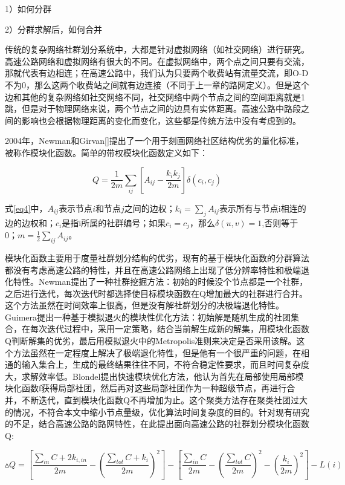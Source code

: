 				1）如何分群

				2）分群求解后，如何合并

			传统的复杂网络社群划分系统中，大都是针对虚拟网络（如社交网络）进行研究。高速公路网络和虚拟网络有很大的不同。在虚拟网络中，两个点之间只要有交流，那就代表有边相连；在高速公路中，我们认为只要两个收费站有流量交流，即O-D不为0，那么这两个收费站之间就有边连接（不同于上一章的路网定义）。但是这个边和其他的复杂网络如社交网络不同，社交网络中两个节点之间的空间距离就是1跳，但是对于物理网络来说，两个节点之间的边具有实体距离。高速公路中路段之间的影响也会根据物理距离的变化而变化，这些都是传统方法中没有考虑到的。

			2004年，Newman和Girvan[]提出了一个用于刻画网络社区结构优劣的量化标准，被称作模块化函数。简单的带权模块化函数定义如下：

			\begin{equation}
			Q = \frac{1}{{2m}}\sum\limits_{ij} {[{A_{ij}} - \frac{{{k_i}{k_j}}}{{2m}}]\delta ({c_i},{c_j})}
			\label{eq4}
			\end{equation}

			式\ref{eq4}中，$A_{ij}$表示节点$i$和节点$j$之间的边权；$k_i=\sum\limits_{j} {A_{ij}}$表示所有与节点i相连的边的边权和；$c_i$是指i所属的社群编号；如果$c_i=c_j$，那么$\delta (u,v)=1$,否则等于0；$m=\frac{1}{{2}}\sum\limits_{ij} {A_{ij}}$。

			模块化函数主要用于度量社群划分结构的优劣，现有的基于模块化函数的分群算法都没有考虑高速公路的特性\parencite{}，并且在高速公路网络上出现了低分辨率特性和极端退化特性\parencite{}。Newman提出了一种社群挖掘方法\parencite{}：初始的时候没个节点都是一个社群，之后进行迭代，每次迭代时都选择使目标模块函数在Q增加最大的社群进行合并。这个方法虽然在时间效率上很高，但是没有解社群划分的决极端退化特性。Guimera提出一种基于模拟退火的模块性优化方法：初始解是随机生成的社团集合，在每次迭代过程中，采用一定策略，结合当前解生成新的解集，用模块化函数Q判断解集的优劣，最后用模拟退火中的Metropolis准则来决定是否采用该解。这个方法虽然在一定程度上解决了极端退化特性，但是他有一个很严重的问题，在相通的输入集合上，生成的最终结果往往不同，不符合稳定性要求，而且时间复杂度大，求解效率低。Blondel\parencite{}提出快速模块优化方法，他认为首先在局部使用局部模块化函数f获得局部社团，然后再对这些局部社团作为一种超级节点，再进行合并，不断迭代，直到模块化函数Q不再增加为止。这个聚类方法存在聚类社团过大的情况，不符合本文中缩小节点量级，优化算法时间复杂度的目的。针对现有研究的不足，结合高速公路的路网特性，在此提出面向高速公路的社群划分模块化函数Q:

			\begin{equation}
			\vartriangle Q = [\frac{{\sum_{in} C  + 2{k_{i,in}}}}{{2m}} - {(\frac{{\sum_{tot} C  + {k_i}}}{{2m}})^2}] - [\frac{{\sum_{in} C }}{{2m}} - {(\frac{{\sum_{tot} C }}{{2m}})^2} - {(\frac{{{k_i}}}{{2m}})^2}] - L(i)
			\label{eq5}
			\end{equation}

